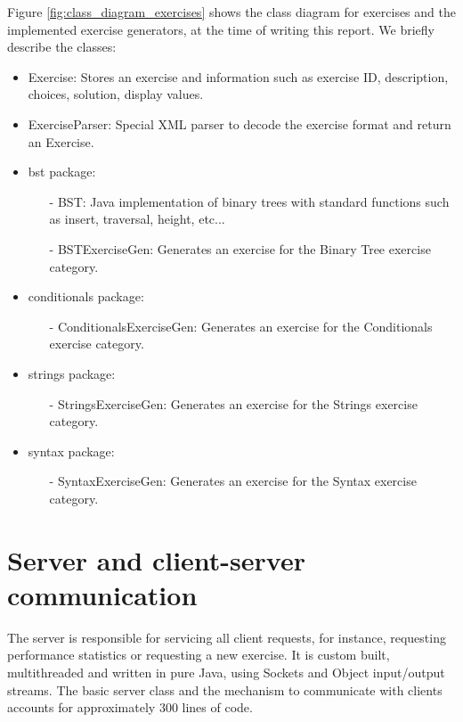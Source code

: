 Figure \ref{fig:class_diagram_exercises} shows the class diagram for exercises and the implemented exercise generators, at the time of writing this report. We briefly describe the classes:
\begin{itemize}
\item \textsf{Exercise}: Stores an exercise and information such as exercise ID, description, choices, solution, display values.
\item \textsf{ExerciseParser}: Special XML parser to decode the exercise format and return an \textsf{Exercise}.
\item \textsf{bst} package:
      \begin{itemize}
      \item[-] \textsf{BST}: Java implementation of binary trees with standard functions such as insert, traversal, height, etc...
      \item[-] \textsf{BSTExerciseGen}: Generates an exercise for the Binary Tree exercise category.
      \end{itemize}
\item \textsf{conditionals} package:
      \begin{itemize}
      \item[-] \textsf{ConditionalsExerciseGen}: Generates an exercise for the Conditionals exercise category.
      \end{itemize}
\item \textsf{strings} package:
      \begin{itemize}
      \item[-] \textsf{StringsExerciseGen}: Generates an exercise for the Strings exercise category.
      \end{itemize}
\item \textsf{syntax} package:
      \begin{itemize}
      \item[-] \textsf{SyntaxExerciseGen}: Generates an exercise for the Syntax exercise category.
      \end{itemize}                 
\end{itemize}

\section{Server and client-server communication}
The server is responsible for servicing all client requests, for instance, requesting performance statistics or requesting a new exercise. It is custom built, multithreaded and written in pure Java, using Sockets and Object input/output streams. The basic server class and the mechanism to communicate with clients accounts for approximately 300 lines of code. \newline

